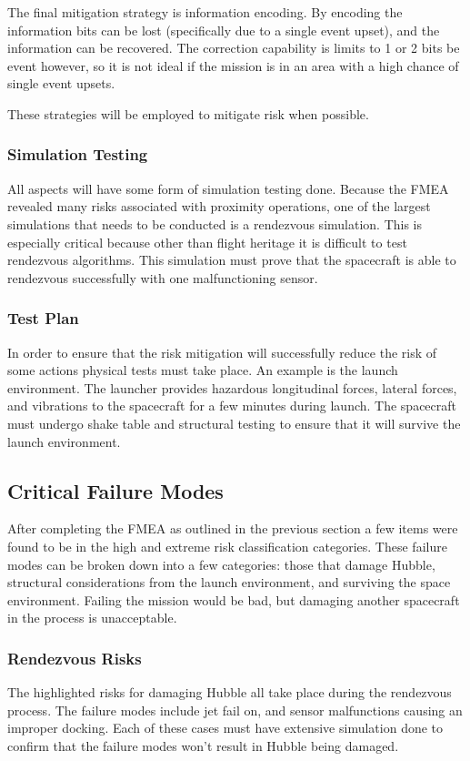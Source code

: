 \documentclass[paper=letter, fontsize=11pt]{scrartcl} %
\numberwithin{equation}{section} %
\numberwithin{figure}{section} %
\numberwithin{table}{section} %
\begin{document}
The final mitigation strategy is information encoding. By encoding the information bits can be lost (specifically due to a single event upset), and the information can be recovered. The correction capability is limits to 1 or 2 bits be event however, so it is not ideal if the mission is in an area with a high chance of single event upsets.

These strategies will be employed to mitigate risk when possible.

\subsubsection{Simulation Testing}
All aspects will have some form of simulation testing done. Because the FMEA revealed many risks associated with proximity operations, one of the largest simulations that needs to be conducted is a rendezvous simulation. This is especially critical because other than flight heritage it is difficult to test rendezvous algorithms. This simulation must prove that the spacecraft is able to rendezvous successfully with one malfunctioning sensor.

\subsubsection{Test Plan}
In order to ensure that the risk mitigation will successfully reduce the risk of some actions physical tests must take place. An example is the launch environment. The launcher provides hazardous longitudinal forces, lateral forces, and vibrations to the spacecraft for a few minutes during launch. The spacecraft must undergo shake table and structural testing to ensure that it will survive the launch environment.

\subsection{Critical Failure Modes}
After completing the FMEA as outlined in the previous section a few items were found to be in the high and extreme risk classification categories. These failure modes can be broken down into a few categories: those that damage Hubble, structural considerations from the launch environment, and surviving the space environment. Failing the mission would be bad, but damaging another spacecraft in the process is unacceptable.

\subsubsection{Rendezvous Risks}
The highlighted risks for damaging Hubble all take place during the rendezvous process. The failure modes include jet fail on, and sensor malfunctions causing an improper docking. Each of these cases must have extensive simulation done to confirm that the failure modes won't result in Hubble being damaged.
\end{document}

